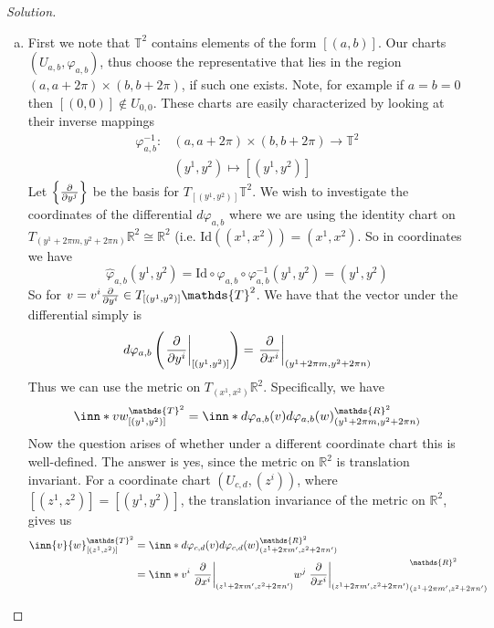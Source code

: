 \documentclass[a4paper]{article}
\begin{document}
\begin{proof}[Solution]
  \begin{enumerate}[(a)]
    \item  First we note that $\mathds{T}^2$ contains elements of the form $[(a,b)]$. Our charts $(U_{a,b}, \varphi_{a,b})$, thus choose the representative that lies in the region $(a,a + 2\pi) \times (b, b + 2\pi)$, if such one exists. Note, for example if $a = b = 0$ then $[(0,0)] \notin U_{0,0}$. These charts are easily characterized by looking at their inverse mappings
      \[
        \begin{aligned}
          \varphi_{a,b}^{-1}:& (a, a+ 2\pi) \times (b, b+2\pi) \rightarrow \mathds{T}^2 \\
          &(y^1,y^2) \mapsto [(y^1,y^2)] 
        \end{aligned}
      \]
      Let $\left\{ \pdv{y^j} \right\}$ be the basis for $T_{[(y^1, y^2)]}\mathds{T}^2$. We wish to investigate the coordinates of the differential $d \varphi_{a,b}$ where we are using the identity chart on $T_{(y^1 + 2\pi m, y^2 + 2\pi n)} \mathds{R}^2 \cong \mathds{R}^2$ (i.e. $\text{Id}((x^1, x^2)) = (x^1, x^2)$. So in coordinates we have
      \[
        \hat{\varphi}_{a,b}(y^1, y^2) = \text{Id} \circ \varphi_{a,b} \circ \varphi_{a,b}^{-1} (y^1, y^2) = (y^1, y^2)
      \]
      So for $v = v^i \pdv{y^i} \in  T_{[(y^1, y^2)]}\mathds{T}^2$. We have that the vector under the differential simply is
      \[
        d\varphi_{a,b} \left( \eval{\pdv{y^i}}_{[(y^1, y^2)]} \right) = \eval{\pdv{x^i}}_{(y^1 + 2\pi m, y^2 + 2\pi n)}
      \]
      Thus we can use the metric on $T_{(x^1, x^2)}\mathds{R}^2$. Specifically, we have
      \[
        \inn*{v}{w}^{\mathds{T}^2}_{[(y^1, y^2)]} = \inn*{d\varphi_{a,b}(v)}{d\varphi_{a,b}(w)}_{(y^1 + 2\pi m, y^2 + 2\pi n)}^{\mathds{R}^2}
      \]
      Now the question arises of whether under a different coordinate chart this is well-defined. The answer is yes, since the metric on $\mathds{R}^2$ is translation invariant. For a coordinate chart $(U_{c,d}, (z^i))$, where $[(z^1, z^2)] = [(y^1, y^2)]$, the translation invariance of the metric on $\mathds{R}^2$, gives us
      \[
        \begin{aligned}
          \inn{v}{w}^{\mathds{T}^2}_{[(z^1, z^2)]} &= \inn*{d \varphi_{c,d}(v)}{d \varphi_{c,d}(w)}_{(z^1 + 2\pi m', z^2 + 2\pi n')}^{\mathds{R}^2} \\
                                                   &= \inn*{ v^i \eval{\pdv{x^i}}_{(z^1 + 2\pi m', z^2 + 2\pi n')}}{w^j \eval{\pdv{x^i}}_{(z^1 + 2\pi m', z^2 + 2\pi n')}}_{(z^1 + 2\pi m', z^2 + 2\pi n')}^{\mathds{R}^2}  \\

\end{aligned}\]
\end{enumerate}
\end{proof}
\end{document}
